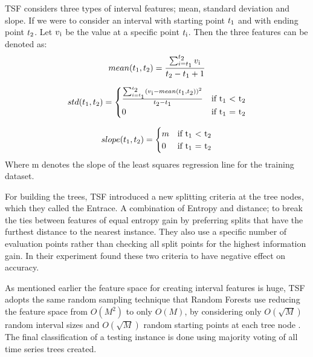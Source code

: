 TSF considers three types of interval features; mean, standard deviation and slope.
If we were to consider an interval with starting point $t\textsubscript{1}$ and with ending point $t\textsubscript{2}$.
Let $v\textsubscript{i}$ be the value at a specific point $t\textsubscript{i}$.
Then the three features can be denoted as:
\begin{equation}
    mean(t\textsubscript{1},t\textsubscript{2})= \frac{\sum_{i=t\textsubscript{1}}^{t\textsubscript{2}} v\textsubscript{i}}{t\textsubscript{2} - t\textsubscript{1} + 1}
\end{equation}

\begin{equation}
    std(t\textsubscript{1},t\textsubscript{2})=
        \begin{cases}
        \frac{\sum_{i=t\textsubscript{1}}^{t\textsubscript{2}} (v\textsubscript{i} - mean(t\textsubscript{1},t\textsubscript{2}))^{2}}
            {t\textsubscript{2} - t\textsubscript{1}}
            & \text{if t\textsubscript{1} $<$ t\textsubscript{2}}\\
        0 & \text{if t\textsubscript{1} = t\textsubscript{2}}
        \end{cases}
\end{equation}

\begin{equation}
    slope(t\textsubscript{1},t\textsubscript{2})=
        \begin{cases}
        m & \text{if t\textsubscript{1} $<$ t\textsubscript{2}}\\
        0 & \text{if t\textsubscript{1} = t\textsubscript{2}}
        \end{cases}
\end{equation}
Where m denotes the slope of the least squares regression line for the training dataset.

For building the trees, TSF introduced a new splitting criteria at the tree nodes, which they called the Entrace. A combination of
Entropy and distance; to break the ties between features of equal entropy gain by preferring splits that have the furthest distance
to the nearest instance. They also use a specific number of evaluation points rather than checking all split points for the highest
information gain. In their experiment \cite{bagnall2017great} found these two criteria to have negative effect on accuracy.

As mentioned earlier the feature space for creating interval features is huge, TSF adopts the same random sampling technique that Random Forests use
reducing the feature space from $O(M^{2})$ to only $O(M)$, by considering only $O(\sqrt{M})$ random interval sizes and $O(\sqrt{M})$
random starting points at each tree node \cite{deng2013time}. The final classification of a testing instance is done using majority
voting of all time series trees created.